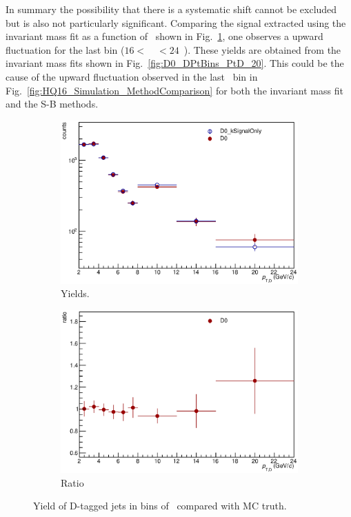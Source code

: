 In summary the possibility that there is a systematic shift cannot be excluded but is also not particularly significant. Comparing the signal extracted using the invariant mass fit
as a function of \ptd\, shown in Fig.~\ref{fig:YieldPtD}, one observes a upward fluctuation for the last bin ($16 < $~\ptd~$<24$~\GeVc). These yields are obtained from the invariant mass fits
shown in Fig.~\ref{fig:D0_DPtBins_PtD_20}. This could be the cause of the upward fluctuation observed in the last \ptchjet\ bin
in Fig.~\ref{fig:HQ16_Simulation_MethodComparison} for both the invariant mass fit and the S-B methods.
\begin{figure}[tbh]
\centering
\begin{subfigure}{0.49\textwidth}
  \centering
  \includegraphics[width=1.0\linewidth]{img/D_Pt_Spectrum_SpectraComparison}
  \caption{Yields.}
\end{subfigure}
\begin{subfigure}{0.49\textwidth}
  \centering
  \includegraphics[width=1.0\linewidth]{img/D_Pt_Spectrum_SpectraComparison_Ratio}
  \caption{Ratio}
\end{subfigure}
\caption{Yield of D-tagged jets in bins of \ptd\ compared with MC truth.}
\label{fig:YieldPtD}
\end{figure}



